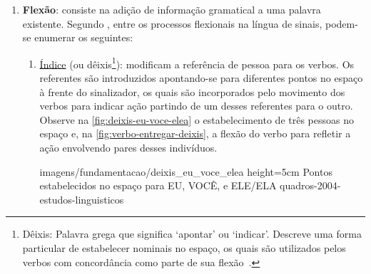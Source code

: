 \begin{enumerate}
\begin{enumerate}


    \end{enumerate}


    \item \textbf{Flexão}: consiste na adição de informação gramatical a uma palavra existente. Segundo , entre os processos flexionais na língua de sinais, podem-se enumerar os seguintes:



    \begin{enumerate}
        \item \underline{Índice} (ou dêixis\footnote{
            Dêixis: Palavra grega que significa `apontar' ou `indicar'. Descreve uma forma particular de estabelecer nominais no espaço, os quais são utilizados pelos verbos com concordância como parte de sua flexão~\cite{quadros-2004-estudos-linguisticos}.
        }): modificam a referência de pessoa para os verbos. Os referentes são introduzidos apontando-se para diferentes pontos no espaço à frente do sinalizador, os quais são incorporados pelo movimento dos verbos para indicar ação partindo de um desses referentes para o outro. Observe na \autoref{fig:deixis-eu-voce-elea} o estabelecimento de três pessoas no espaço e, na \autoref{fig:verbo-entregar-deixis}, a flexão do verbo para refletir a ação envolvendo pares desses indivíduos.

            {imagens/fundamentacao/deixis_eu_voce_elea} %
            {height=5cm} %
            {Pontos estabelecidos no espaço para EU, VOCÊ, e ELE/ELA} %
            {quadros-2004-estudos-linguisticos} %


\end{enumerate}
\end{enumerate}
